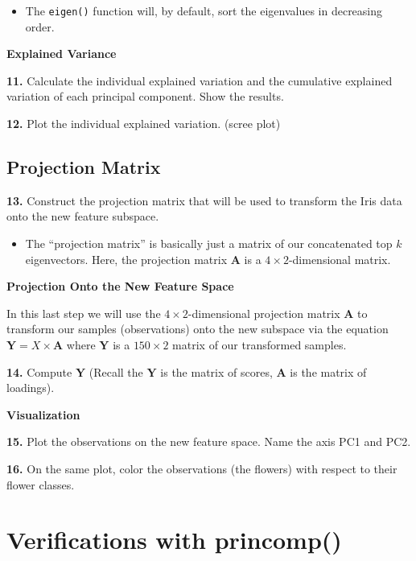 \documentclass[]{book}
\newenvironment{rmdblock}[1]
  {\begin{shaded*}
  \begin{itemize}
  \renewcommand{\labelitemi}{
    \raisebox{-.7\height}[0pt][0pt]{
      {\setkeys{Gin}{width=2em,keepaspectratio}\texttt{[image: img/icons/\#1]}}
    }
  }
  \item
  }
  {
  \end{itemize}
  \end{shaded*}
  }
\newenvironment{rmdinsight}
  {\begin{rmdblock}{insight}}
  {\end{rmdblock}}
\newenvironment{rmdtip}
  {\begin{rmdblock}{tip}}
  {\end{rmdblock}}
\begin{document}
\begin{rmdinsight}
The \texttt{eigen()} function will, by default, sort the eigenvalues in
decreasing order.
\end{rmdinsight}

\textbf{Explained Variance}

\textbf{11.} Calculate the individual explained variation and the
cumulative explained variation of each principal component. Show the
results.

\textbf{12.} Plot the individual explained variation. (scree plot)

\subsection*{Projection Matrix}\label{projection-matrix}

\textbf{13.} Construct the projection matrix that will be used to
transform the Iris data onto the new feature subspace.

\begin{rmdtip}
The ``projection matrix'' is basically just a matrix of our concatenated
top \(k\) eigenvectors. Here, the projection matrix \(\mathbf{A}\) is a
\(4 \times 2\)-dimensional matrix.
\end{rmdtip}

\textbf{Projection Onto the New Feature Space}

In this last step we will use the \(4 \times 2\)-dimensional projection
matrix \(\mathbf{A}\) to transform our samples (observations) onto the
new subspace via the equation \(\mathbf{Y}=X \times \mathbf{A}\) where
\(\mathbf{Y}\) is a \(150 \times 2\) matrix of our transformed samples.

\textbf{14.} Compute \(\mathbf{Y}\) (Recall the \(\mathbf{Y}\) is the
matrix of scores, \(\mathbf{A}\) is the matrix of loadings).

\textbf{Visualization}

\textbf{15.} Plot the observations on the new feature space. Name the
axis PC1 and PC2.

\textbf{16.} On the same plot, color the observations (the flowers) with
respect to their flower classes.

\section*{Verifications with
princomp()}\label{verifications-with-princomp}
\end{document}
